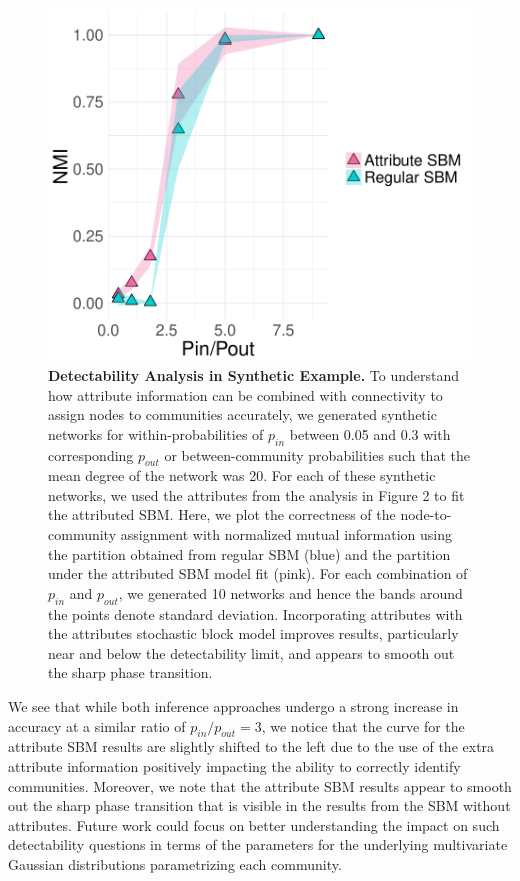 \begin{figure}[h!]
\begin{center}
\includegraphics[width=.5\textwidth]{DetectExp.pdf}
\caption{{\bf Detectability Analysis in Synthetic Example.} To understand how attribute information can be combined with connectivity to assign nodes to communities accurately, we generated synthetic networks for within-probabilities of $p_{in}$ between 0.05 and 0.3 with corresponding $p_{out}$ or between-community probabilities such that the mean degree of the network was 20. For each of these synthetic networks, we used the attributes from the analysis in Figure 2 to fit the attributed SBM. Here, we plot the correctness of the node-to-community assignment with normalized mutual information using the partition obtained from regular SBM (blue) and the partition under the attributed SBM model fit (pink). For each combination of $p_{in}$ and $p_{out}$, we generated 10 networks and hence the bands around the points denote standard deviation. Incorporating attributes with the attributes stochastic block model improves results, particularly near and below the detectability limit, and appears to smooth out the sharp phase transition. }
\label{Fig3}
\end{center}
\end{figure}

We see that while both inference approaches undergo a strong increase in accuracy at a similar ratio of $p_{in}/p_{out}=3$, we notice that the curve for the attribute SBM results are slightly shifted to the left due to the use of the extra attribute information positively impacting the ability to correctly identify communities. Moreover, we note that the attribute SBM results appear to smooth out the sharp phase transition that is visible in the results from the SBM without attributes. Future work could focus on better understanding the impact on such detectability questions in terms of the parameters for the underlying multivariate Gaussian distributions parametrizing each community. %

